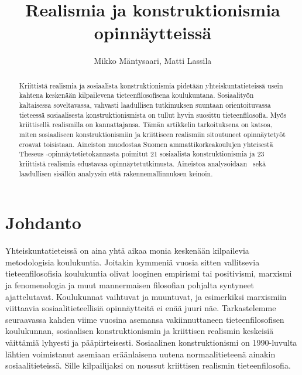 \documentclass[a4paper,11pt,finnish]{article}
\author{Mikko M{\"a}ntysaari, Matti Lassila}
\title{Realismia ja konstruktionismia opinnäytteissä}
\begin{document}
\pagestyle{plain}
\maketitle




\newpage
\thispagestyle{empty}
\begin{abstract}
\begin{normalsize}
\noindent Kriittistä realismia ja sosiaalista konstruktionismia pidetään
yhteiskuntatieteissä usein kahtena keskenään kilpailevena
tieteenfilosofisena koulukuntana. Sosiaalityön kaltaisessa soveltavassa,
vahvasti laadullisen tutkimuksen suuntaan orientoituvassa tieteessä
sosiaalisesta konstruktionismista on tullut hyvin suosittu
tieteenfilosofia. Myös kriittisellä realismilla on kannattajansa. Tämän
artikkelin tarkoituksena on katsoa, miten sosiaaliseen
konstruktionismiin ja kriittiseen realismiin sitoutuneet opinnäytetyöt
eroavat toisistaan. Aineiston muodostaa Suomen ammattikorkeakoulujen
yhteisestä Theseus -opinnäytetietokannasta poimitut 21 sosiaalista
konstruktionismia ja 23 kriittistä realismia edustavaa
opinnäytetutkimusta. Aineistoa analysoidaan~ sekä laadullisen sisällön
analyysin että rakennemallinnuksen keinoin.~

\end{normalsize}
\end{abstract}

\newpage






\section*{Johdanto}\label{johdanto}

Yhteiskuntatieteissä on aina yhtä aikaa monia keskenään kilpailevia
metodologisia koulukuntia. Joitakin kymmeniä vuosia sitten vallitsevia
tieteenfilosofisia koulukuntia olivat looginen empirismi tai
positivismi, marxismi ja fenomenologia ja muut mannermaisen filosofian
pohjalta syntyneet ajattelutavat. Koulukunnat vaihtuvat ja muuntuvat, ja
esimerkiksi marxismiin viittaavia sosiaalitieteellisiä opinnäytteitä ei
enää juuri näe. Tarkastelemme seuraavassa kahden viime vuosina asemansa
vakiinnuttaneen tieteenfilosofisen koulukunnan, sosiaalisen
konstruktionismin ja kriittisen realismin keskeisiä väittämiä lyhyesti
ja pääpiirteisesti. Sosiaalinen konstruktionismi on 1990-luvulta lähtien
voimistanut asemiaan eräänlaisena uutena normaalitieteenä ainakin
sosiaalitieteissä. Sille kilpailijaksi on noussut kriittisen realismin
tieteenfilosofia.
\end{document}
